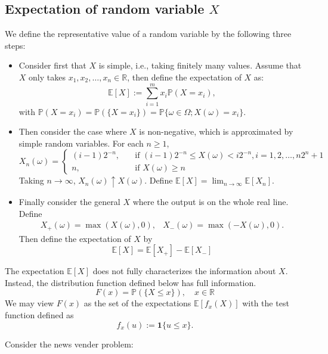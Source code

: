 \subsection{Expectation of random variable $X$}
We define the representative value of a random variable by the following three steps:
\begin{itemize}
\item
Consider first that $X$ is simple, i.e., taking finitely many values.
Assume that $X$ only takes $x_1,x_2,\ldots,x_n\in\mathbb{R}$,
then define the expectation of $X$ as:
\[
\mathbb{E}[X]:=\sum_{i=1}^m x_i\mathbb{P}(X=x_i),
\]
with $\mathbb{P}(X = x_i) = \mathbb{P}(\{X=x_i\})=\mathbb{P}\{\omega\in\Omega; X(\omega)=x_i\}$.
\item
Then consider the case where $X$ is non-negative, which is approximated by simple random variables.
For each $n\ge1$, 
\[
X_n(\omega) = \left\{
\begin{aligned}
(i-1)2^{-n},&\quad\text{if $(i-1)2^{-n}\le X(\omega)<i2^{-n}, i=1,2,\dots,n2^n+1$}\\
n,&\quad\text{if $X(\omega)\ge n$}
\end{aligned}
\right.
\]
Taking $n\to\infty$, $X_n(\omega)\uparrow X(\omega)$.
Define $\mathbb{E}[X] = \lim_{n\to\infty}\mathbb{E}[X_n]$.
\item
Finally consider the general $X$ where the output is on the whole real line.
Define
\[
\begin{array}{ll}
X_+(\omega) = \max(X(\omega),0),
&
X_-(\omega) = \max(-X(\omega),0).
\end{array}
\]
Then define the expectation of $X$ by
\[
\mathbb{E}[X] = \mathbb{E}[X_+] -  \mathbb{E}[X_-]
\]
\end{itemize}
\begin{remark}
The expectation $\mathbb{E}[X]$ does not fully characterizes the information about $X$.
Instead, the distribution function defined below has full information.
\[
F(x)=\mathbb{P}(\{X\le x\}),\quad x\in\mathbb{R}
\]
We may view $F(x)$ as the set of the expectations $\mathbb{E}[f_x(X)]$ with the test function defined as
\[
f_x(u):=\bm 1\{u\le x\}.
\]



\end{remark}





\begin{example}
Consider the news vender problem:
\end{example}



